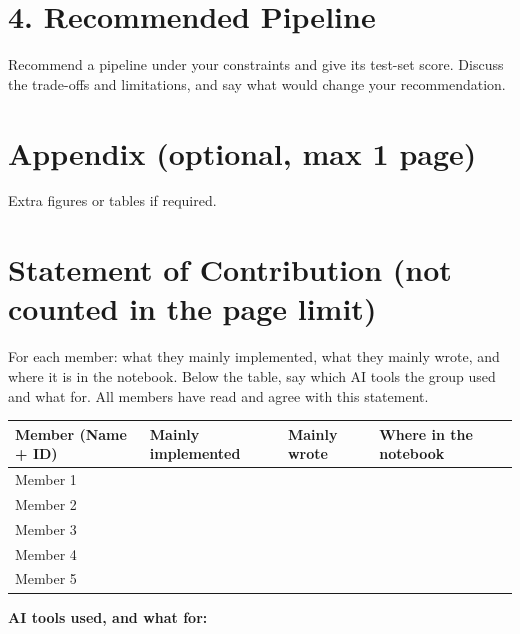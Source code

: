 \documentclass[11pt,a4paper]{article}
\begin{document}
\section*{4. Recommended Pipeline}
Recommend a pipeline under your constraints and give its test-set score. Discuss the trade-offs and limitations, and say what would change your recommendation.

\section*{Appendix (optional, max 1 page)}
Extra figures or tables if required.

\section*{Statement of Contribution (not counted in the page limit)}
For each member: what they mainly implemented, what they mainly wrote, and where it is in the notebook. Below the table, say which AI tools the group used and what for. All members have read and agree with this statement.

\vspace{0.5em}
\noindent
\begin{tabularx}{\textwidth}{|l|>{\raggedright\arraybackslash}X|>{\raggedright\arraybackslash}X|>{\raggedright\arraybackslash}X|}
\hline
\textbf{Member (Name + ID)} & \textbf{Mainly implemented} & \textbf{Mainly wrote} & \textbf{Where in the notebook} \\
\hline
Member 1 & & & \\
\hline
Member 2 & & & \\
\hline
Member 3 & & & \\
\hline
Member 4 & & & \\
\hline
Member 5 & & & \\
\hline
\end{tabularx}

\vspace{0.5em}
\noindent\textbf{AI tools used, and what for:}
\end{document}
